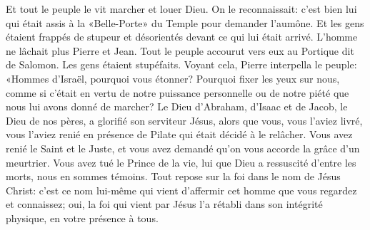 Et tout le peuple le vit marcher et louer Dieu.
On le reconnaissait:
	c’est bien lui qui était assis à la «Belle-Porte» du Temple pour demander l’aumône.
Et les gens étaient frappés de stupeur et désorientés devant ce qui lui était arrivé.
L’homme ne lâchait plus Pierre et Jean.
Tout le peuple accourut vers eux au Portique dit de Salomon.
	Les gens étaient stupéfaits.
Voyant cela, Pierre interpella le peuple:
	«Hommes d’Israël, pourquoi vous étonner?
	Pourquoi fixer les yeux sur nous,
	comme si c’était en vertu de notre puissance personnelle ou de notre piété
		que nous lui avons donné de marcher?
Le Dieu d’Abraham, d’Isaac et de Jacob, le Dieu de nos pères,
	a glorifié son serviteur Jésus, alors que vous, vous l’aviez livré,
	vous l’aviez renié en présence de Pilate qui était décidé à le relâcher.
Vous avez renié le Saint et le Juste,
	et vous avez demandé qu’on vous accorde la grâce d’un meurtrier.
Vous avez tué le Prince de la vie,
	lui que Dieu a ressuscité d’entre les morts, nous en sommes témoins.
Tout repose sur la foi dans le nom de Jésus Christ:
	c’est ce nom lui-même qui vient d’affermir cet homme que vous regardez et connaissez;
	oui, la foi qui vient par Jésus l’a rétabli dans son intégrité physique,
	en votre présence à tous.
